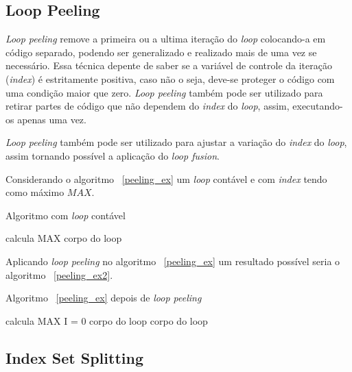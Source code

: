 \subsection{Loop Peeling}

\textit{Loop peeling} remove a primeira ou a ultima iteração do \textit{loop} 
colocando-a em código separado, podendo ser generalizado e realizado mais 
de uma vez se necessário. 
Essa técnica depente de saber se a variável de controle da iteração
(\textit{index}) é estritamente positiva, caso não o seja, deve-se proteger 
o código com uma condição maior que zero.
\textit{Loop peeling} também pode ser utilizado para retirar partes de código 
que não dependem do \textit{index} do \textit{loop}, assim, executando-os apenas
uma vez.

\textit{Loop peeling} também pode ser utilizado para ajustar a variação do 
\textit{index} do \textit{loop}, assim tornando possível a aplicação 
do \textit{loop fusion}.

Considerando o algoritmo ~\ref{peeling_ex} um \textit{loop} contável e 
com \textit{index} tendo como máximo $MAX$.

\begin{algorithm}
\caption{Algoritmo com \textit{loop} contável}
\label{peeling_ex}
\begin{algorithmic}[1]

\STATE calcula MAX
\STATE corpo do loop
\ENDFOR

\end{algorithmic}
\end{algorithm}

Aplicando \textit{loop peeling} no algoritmo ~\ref{peeling_ex} um resultado
possível seria o algoritmo ~\ref{peeling_ex2}.

\begin{algorithm}
\caption{Algoritmo ~\ref{peeling_ex} depois de \textit{loop peeling}}
\label{peeling_ex2}
\begin{algorithmic}[1]

\STATE calcula MAX
\STATE I = 0
\STATE corpo do loop
\STATE corpo do loop
\ENDFOR
\ENDIF

\end{algorithmic}
\end{algorithm}


\subsection{Index Set Splitting}

